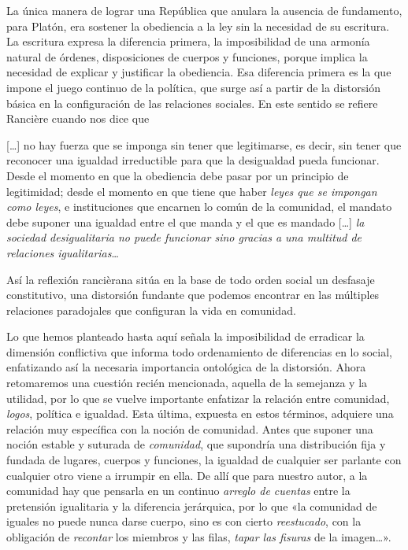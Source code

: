 La única manera de lograr una República que anulara la ausencia de fundamento, para Platón, era sostener la obediencia a la ley sin la necesidad de su escritura. La escritura expresa la diferencia primera, la imposibilidad de una armonía natural de órdenes, disposiciones de cuerpos y funciones, porque implica la necesidad de explicar y justificar la obediencia. Esa diferencia primera es la que impone el juego continuo de la política, que surge así a partir de la distorsión básica en la configuración de las relaciones sociales. En este sentido se refiere Rancière cuando nos dice que

{[}\ldots{]} no hay fuerza que se imponga sin tener que legitimarse, es decir, sin tener que reconocer una igualdad irreductible para que la desigualdad pueda funcionar. Desde el momento en que la obediencia debe pasar por un principio de legitimidad; desde el momento en que tiene que haber \emph{leyes que se impongan como leyes}, e instituciones que encarnen lo común de la comunidad, el mandato debe suponer una igualdad entre el que manda y el que es mandado {[}\ldots{]} \emph{la sociedad desigualitaria no puede funcionar sino gracias a una multitud de relaciones igualitarias}\ldots{}

Así la reflexión rancièrana sitúa en la base de todo orden social un desfasaje constitutivo, una distorsión fundante que podemos encontrar en las múltiples relaciones paradojales que configuran la vida en comunidad.

Lo que hemos planteado hasta aquí señala la imposibilidad de erradicar la dimensión conflictiva que informa todo ordenamiento de diferencias en lo social, enfatizando así la necesaria importancia ontológica de la distorsión. Ahora retomaremos una cuestión recién mencionada, aquella de la semejanza y la utilidad, por lo que se vuelve importante enfatizar la relación entre comunidad, \emph{logos}, política e igualdad. Esta última, expuesta en estos términos, adquiere una relación muy específica con la noción de comunidad. Antes que suponer una noción estable y suturada de \emph{comunidad}, que supondría una distribución fija y fundada de lugares, cuerpos y funciones, la igualdad de cualquier ser parlante con cualquier otro viene a irrumpir en ella. De allí que para nuestro autor, a la comunidad hay que pensarla en un continuo \emph{arreglo de cuentas} entre la pretensión igualitaria y la diferencia jerárquica, por lo que «la comunidad de iguales no puede nunca darse cuerpo, sino es con cierto \emph{reestucado}, con la obligación de \emph{recontar} los miembros y las filas, \emph{tapar las fisuras} de la imagen\ldots».

